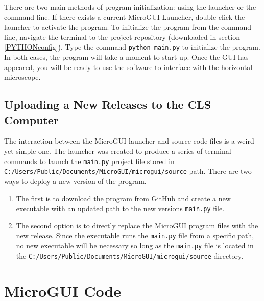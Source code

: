 \documentclass[a4paper, 12pt]{report}
\begin{document}
    There are two main methods of program initialization: using the launcher or the command line. If there exists a current MicroGUI Launcher, double-click the launcher to activate the program. To initialize the program from the command line, navigate the terminal to the project repository (downloaded in section \ref{PYTHONconfig}). Type the command \verb|python main.py| to initialize the program. In both cases, the program will take a moment to start up. Once the GUI has appeared, you will be ready to use the software to interface with the horizontal microscope.
    
    \section{Uploading a New Releases to the CLS Computer}
    
    The interaction between the MicroGUI launcher and source code files is a weird yet simple one. The launcher was created to produce a series of terminal commands to launch the \verb|main.py| project file stored in \verb|C:/Users/Public/Documents/MicroGUI/microgui/source| path. There are two ways to deploy a new version of the program.
    
    \begin{enumerate}
        \item The first is to download the program from GitHub and create a new executable with an updated path to the new versions \verb|main.py| file.
        \item The second option is to directly replace the MicroGUI program files with the new release. Since the executable runs the \verb|main.py| file from a specific path, no new executable will be necessary so long as the \verb|main.py| file is located in the \verb|C:/Users/Public/Documents/MicroGUI/microgui/source| directory.
    \end{enumerate}
    
    
    
    
    \chapter{MicroGUI Code}
\end{document}
